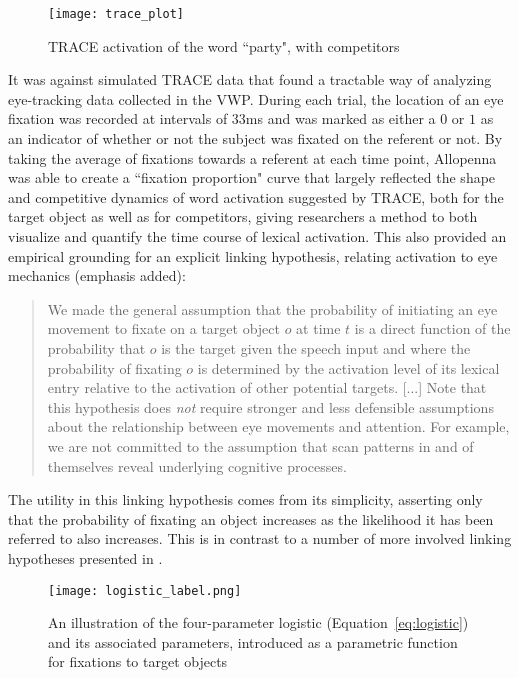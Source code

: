 \begin{figure}[H]
\centering
\texttt{[image: trace\_plot]}
\caption{TRACE activation of the word ``party", with competitors}
\label{fig:trace_plot}
\end{figure}



It was against simulated TRACE data that \citet{allopenna1998tracking} found a tractable way of analyzing eye-tracking data collected in the VWP.  During each trial, the location of an eye fixation was recorded at intervals of 33ms and was marked as either a $0$ or $1$ as an indicator of whether or not the subject was fixated on the referent or not. By taking the average of fixations towards a referent at each time point, Allopenna was able to create a ``fixation proportion" curve that largely reflected the shape and competitive dynamics of word activation suggested by TRACE, both for the target object as well as for competitors, giving researchers a method to both visualize and quantify the time course of lexical activation. This also provided an empirical grounding for an explicit linking hypothesis, relating activation to eye mechanics  (emphasis added):

\begin{quote}
We made the general assumption that the probability of initiating an eye movement to fixate on a target object $o$ at time $t$ is a direct function of the probability that $o$ is the target given the speech input and where the probability of fixating $o$ is determined by the activation level of its lexical entry relative to the activation of other potential targets. [...] Note that this hypothesis does \emph{not} require stronger and less defensible assumptions about the relationship between eye  movements and attention. For example, we are not committed to the assumption that scan patterns in and of themselves reveal underlying cognitive processes. \citep{allopenna1998tracking}
\end{quote}

The utility in this linking hypothesis comes from its simplicity, asserting only that the probability of fixating an object increases as the likelihood it has been referred to also increases. This is in contrast to a number of more involved linking hypotheses presented in \citet{Magnuson2019}.


\begin{figure}[H]
\centering
\texttt{[image: logistic\_label.png]}
\caption{An illustration of the four-parameter logistic (Equation~\ref{eq:logistic}) and its associated parameters, introduced as a parametric function for fixations to target objects}
\label{fig:logistic_definition}
\end{figure}

